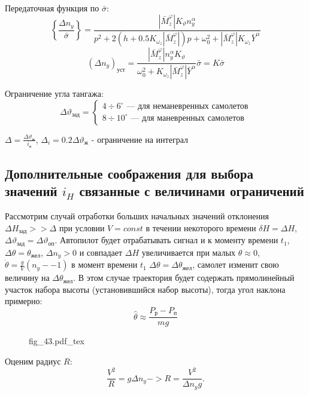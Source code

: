 \documentclass{article}
\newcommand{\incfig}[1]{
    {#1.pdf_tex}
}
\begin{document}
Передаточная функция по $\bar{\sigma}$:
\[
    \left\{\frac{\Delta n_y}{\bar{\sigma}} \right\} =\frac{|\bar{M}_z^\varphi|
    K_{\vartheta} n_y^\alpha}{ p^2 + 2(h + 0.5 K_{\omega_z} |
\bar{M}_z^{\varphi} |)p + \omega_0^2 + | \bar{M}_z^{\varphi}| K_{\omega_z}
\bar{Y}^\alpha}
\]
\[
    \left( \Delta n_y\right)_\text{уст} = \frac{| \bar{M}_z^{\varphi}|
    n_y^\alpha K_\vartheta}{\omega_0^2 + K_{\omega_z} | \bar{M}_z^{\varphi} |
    \bar{Y}^\alpha} \bar{\sigma} = K \bar{\sigma}
\]

Ограничение угла тангажа:
\begin{equation}
    \Delta \vartheta_\text{зад} =
    \begin{cases}
        4 \div 6^\circ \text{ --- для неманевренных самолетов} \\
        8 \div 10^\circ \text{ --- для маневренных самолетов}
    \end{cases}
\end{equation}

$\Delta =\frac{\Delta \vartheta_\text{ж}}{i_\text{н}}$, $\Delta_i = 0.2 \Delta
\vartheta_\text{ж}$ - ограничение на интеграл

\subsection{Дополнительные соображения для выбора значений
\texorpdfstring{$i_H$}{Lg} связанные с величинами ограничений}
Рассмотрим случай отработки больших начальных значений отклонения $\Delta
H_\text{зад} >> \Delta$ при условии $V = const$ в течении некоторого времени
$\delta H = \Delta H$, $\Delta \vartheta_\text{зад}  = \Delta
\vartheta_\text{оп}$. Автопилот будет отрабатывать сигнал и к моменту времени
$t_1$, $\Delta \theta = \theta_\text{жел}$, $ \Delta n_y  >0 $ и совпадает
$\Delta H$ увеличивается при малых $\theta \approx 0$, $ \dot{\theta} =
\frac{g}{V}(n_y - -1)$ в момент времени $t_1$ $\Delta \theta = \Delta
\theta_\text{жел}$, самолет изменит свою величину на $\Delta
\theta_\text{жел}$. В этом случае траектория будет содержать прямолинейный
участок набора высоты (установившийся набор высоты), тогда угол наклона
примерно:
\[
    \hat{\theta} \approx \frac{P_\text{р} - P_\text{п}}{mg}
\]

\begin{figure}[H]
    \centering
    \incfig{fig_43}
    \label{fig:fig_43}
\end{figure}

Оценим радиус $R$:
\[
    \frac{V^2}{R} = g \Delta n_y -> R = \frac{V^2}{ \Delta n_y g}
    .\]
\end{document}
